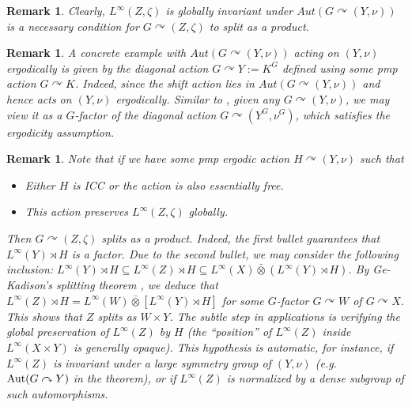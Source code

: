 \documentclass[12pt]{amsart}
\newcommand{\Aut}{{\rm Aut}}
\newtheorem{remark}[thm]{Remark}
\theoremstyle{definition}
\begin{document}
\begin{remark}
Clearly, $L^{\infty}(Z,\zeta)$ is globally invariant under $Aut(G\curvearrowright (Y,\nu))$ is a necessary condition for $G\curvearrowright (Z,\zeta)$ to split as a product.
\end{remark}

\begin{remark}
A concrete example with $Aut(G\curvearrowright (Y,\nu))$ acting on $(Y,\nu)$ ergodically is given by the diagonal action $G\curvearrowright Y:=K^G$ defined using some pmp action $G\curvearrowright K$. Indeed, since the shift action lies in $Aut(G\curvearrowright (Y, \nu))$ and hence acts on $(Y,\nu)$ ergodically. Similar to \cite[Lemma 4.2]{ben-pinsker}, given any $G\curvearrowright (Y,\nu)$, we may view it as a $G$-factor of the diagonal action $G\curvearrowright (Y^G,\nu^G)$, which satisfies the ergodicity assumption.
\end{remark}


\begin{remark}
Note that if we have some pmp ergodic action $H\curvearrowright (Y,\nu)$ such that
\begin{itemize}
    \item Either $H$ is ICC or the action is also essentially free.
    \item This action preserves $L^{\infty}(Z,\zeta)$ globally.
\end{itemize}
Then $G\curvearrowright (Z,\zeta)$ splits as a product.
Indeed, the first bullet guarantees that $L^{\infty}(Y)\rtimes H$ is a factor. Due to the second bullet, we may consider the following inclusion:
$L^{\infty}(Y)\rtimes H\subseteq L^{\infty}(Z)\rtimes H\subseteq L^{\infty}(X)\bar{\otimes}(L^{\infty}(Y)\rtimes H)$. By Ge-Kadison's splitting theorem \cite{ge1996tensor}, we deduce that $L^{\infty}(Z)\rtimes H=L^{\infty}(W)\bar{\otimes}[L^{\infty}(Y)\rtimes H]$ for some $G$-factor $G\curvearrowright W$ of $G\curvearrowright X$. This shows that $Z$ splits as $W\times Y$. The subtle step in applications is verifying the global preservation
of $L^\infty(Z)$ by $H$ (the “position” of $L^\infty(Z)$ inside $L^\infty(X\times Y)$ is
generally opaque). This hypothesis is automatic, for instance, if $L^\infty(Z)$ is invariant
under a large symmetry group of $(Y,\nu)$ (e.g.\ $\Aut(G\curvearrowright Y)$ in the theorem),
or if $L^\infty(Z)$ is normalized by a dense subgroup of such automorphisms.
\end{remark}
\end{document}

